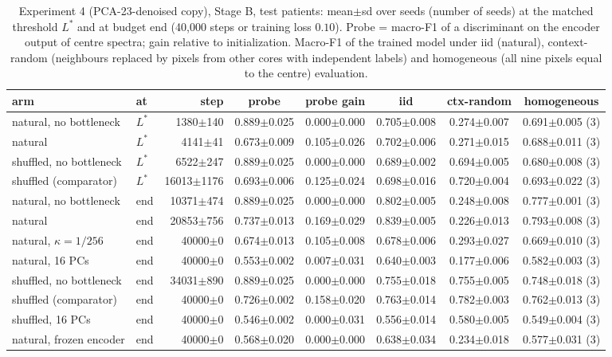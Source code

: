 \begin{table}[htbp]\centering\scriptsize
\caption{Experiment 4 (PCA-23-denoised copy), Stage B, test patients: mean$\pm$sd over seeds (number of seeds) at the matched threshold $L^\ast$ and at budget end (40{,}000 steps or training loss $0.10$). Probe = macro-F1 of a discriminant on the encoder output of centre spectra; gain relative to initialization. Macro-F1 of the trained model under iid (natural), context-random (neighbours replaced by pixels from other cores with independent labels) and homogeneous (all nine pixels equal to the centre) evaluation.}\label{tab:exp4_test_pca23}
\begin{tabular}{llrccccc}\toprule
arm & at & step & probe & probe gain & iid & ctx-random & homogeneous \\ \midrule
natural, no bottleneck & $L^\ast$ & 1380$\pm$140 & 0.889$\pm$0.025 & 0.000$\pm$0.000 & 0.705$\pm$0.008 & 0.274$\pm$0.007 & 0.691$\pm$0.005 (3) \\
natural & $L^\ast$ & 4141$\pm$41 & 0.673$\pm$0.009 & 0.105$\pm$0.026 & 0.702$\pm$0.006 & 0.271$\pm$0.015 & 0.688$\pm$0.011 (3) \\
shuffled, no bottleneck & $L^\ast$ & 6522$\pm$247 & 0.889$\pm$0.025 & 0.000$\pm$0.000 & 0.689$\pm$0.002 & 0.694$\pm$0.005 & 0.680$\pm$0.008 (3) \\
shuffled (comparator) & $L^\ast$ & 16013$\pm$1176 & 0.693$\pm$0.006 & 0.125$\pm$0.024 & 0.698$\pm$0.016 & 0.720$\pm$0.004 & 0.693$\pm$0.022 (3) \\
\midrule
natural, no bottleneck & end & 10371$\pm$474 & 0.889$\pm$0.025 & 0.000$\pm$0.000 & 0.802$\pm$0.005 & 0.248$\pm$0.008 & 0.777$\pm$0.001 (3) \\
natural & end & 20853$\pm$756 & 0.737$\pm$0.013 & 0.169$\pm$0.029 & 0.839$\pm$0.005 & 0.226$\pm$0.013 & 0.793$\pm$0.008 (3) \\
natural, $\kappa=1/256$ & end & 40000$\pm$0 & 0.674$\pm$0.013 & 0.105$\pm$0.008 & 0.678$\pm$0.006 & 0.293$\pm$0.027 & 0.669$\pm$0.010 (3) \\
natural, 16 PCs & end & 40000$\pm$0 & 0.553$\pm$0.002 & 0.007$\pm$0.031 & 0.640$\pm$0.003 & 0.177$\pm$0.006 & 0.582$\pm$0.003 (3) \\
shuffled, no bottleneck & end & 34031$\pm$890 & 0.889$\pm$0.025 & 0.000$\pm$0.000 & 0.755$\pm$0.018 & 0.755$\pm$0.005 & 0.748$\pm$0.018 (3) \\
shuffled (comparator) & end & 40000$\pm$0 & 0.726$\pm$0.002 & 0.158$\pm$0.020 & 0.763$\pm$0.014 & 0.782$\pm$0.003 & 0.762$\pm$0.013 (3) \\
shuffled, 16 PCs & end & 40000$\pm$0 & 0.546$\pm$0.002 & 0.000$\pm$0.031 & 0.556$\pm$0.014 & 0.580$\pm$0.005 & 0.549$\pm$0.004 (3) \\
natural, frozen encoder & end & 40000$\pm$0 & 0.568$\pm$0.020 & 0.000$\pm$0.000 & 0.638$\pm$0.034 & 0.234$\pm$0.018 & 0.577$\pm$0.031 (3) \\
\bottomrule
\end{tabular}\end{table}
